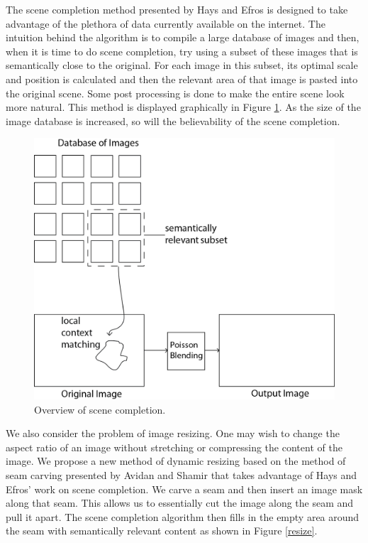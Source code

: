 \documentclass[11pt]{amsart}
\begin{document}
The scene completion method presented by Hays and Efros is designed to take advantage of the plethora of data currently available on the internet. The intuition behind the algorithm is to compile a large database of images and then, when it is time to do scene completion, try using a subset of these images that is semantically close to the original. For each image in this subset, its optimal scale and position is calculated and then the relevant area of that image is pasted into the original scene. Some post processing is done to make the entire scene look more natural. This method is displayed graphically in Figure \ref{scene}. As the size of the image database is increased, so will the believability of the scene completion.

\begin{figure}[htbp]
\begin{center}
\includegraphics[scale=.5]{projectOverview.png}
\caption{Overview of scene completion.}
\label{scene}
\end{center}
\end{figure}

We also consider the problem of image resizing. One may wish to change the aspect ratio of an image without stretching or compressing the content of the image. We propose a new method of dynamic resizing based on the method of seam carving presented by Avidan and Shamir \cite{Avidan:2007} that takes advantage of Hays and Efros' work on scene completion. We carve a seam and then insert an image mask along that seam. This allows us to essentially cut the image along the seam and pull it apart. The scene completion algorithm then fills in the empty area around the seam with semantically relevant content as shown in Figure \ref{resize}. 
\end{document}
